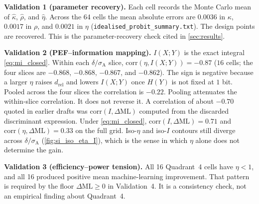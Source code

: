 \textbf{Validation 1 (parameter recovery).} Each cell records the Monte Carlo mean of $\hat\kappa$, $\hat\rho$, and $\hat\eta$. Across the 64 cells the mean absolute errors are $0.0036$ in $\kappa$, $0.0017$ in $\rho$, and $0.0021$ in $\eta$ (\texttt{idealised\_probit\_summary.txt}). The design points are recovered. This is the parameter-recovery check cited in \cref{sec:results}.

\textbf{Validation 2 (PEF--information mapping).} $I(X;Y)$ is the exact integral \cref{eq:mi_closed}. Within each $\delta/\sigma_{\mathrm{A}}$ slice, $\mathrm{corr}(\eta,I(X;Y))=-0.87$ ($16$ cells; the four slices are $-0.868$, $-0.868$, $-0.867$, and $-0.862$). The sign is negative because a larger $\eta$ raises $d_{\mathrm{rel}}$ and lowers $I(X;Y)$ once $H(Y)$ is not fixed at $1$ bit. Pooled across the four slices the correlation is $-0.22$. Pooling attenuates the within-slice correlation. It does not reverse it. A correlation of about $-0.70$ quoted in earlier drafts was $\mathrm{corr}(I,\Delta\mathrm{ML})$ computed from the discarded discriminant expression. Under \cref{eq:mi_closed}, $\mathrm{corr}(I,\Delta\mathrm{ML})=0.71$ and $\mathrm{corr}(\eta,\Delta\mathrm{ML})=0.33$ on the full grid. Iso-$\eta$ and iso-$I$ contours still diverge across $\delta/\sigma_{\mathrm{A}}$ (\cref{fig:si_iso_eta_I}), which is the sense in which $\eta$ alone does not determine the gain.

\textbf{Validation 3 (efficiency--power tension).} All 16 Quadrant~4 cells have $\eta<1$, and all 16 produced positive mean machine-learning improvement. That pattern is required by the floor $\Delta\mathrm{ML}\ge 0$ in Validation~4. It is a consistency check, not an empirical finding about Quadrant~4.


